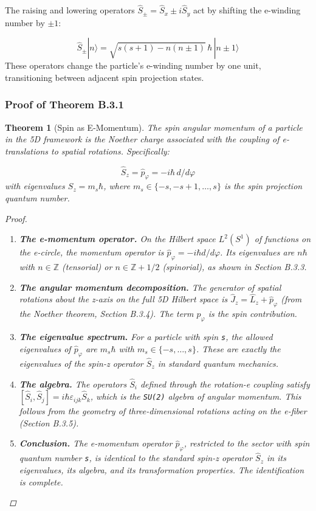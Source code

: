 \documentclass[aps,prd,preprint,superscriptaddress,longbibliography,floatfix]{revtex4-2}
\newtheorem{theorem}{Theorem}[section]
\theoremstyle{remark}
\begin{document}
The raising and lowering operators $\hat{S}_\pm = \hat{S}_x \pm i\hat{S}_y$ act by shifting the e-winding number by $\pm1$:


\begin{equation}
    \hat{S}_\pm |n\rangle = \sqrt{s(s+1) - n(n \pm 1)} \, \hbar \, |n \pm 1\rangle
\end{equation}
These operators change the particle's e-winding number by one unit, transitioning between adjacent spin projection states.


\subsubsection{Proof of Theorem B.3.1}

\begin{theorem}[Spin as E-Momentum]
\label{thm:B31} \textit{The spin angular momentum of a particle in the 5D framework is the Noether charge associated with the coupling of e-translations to spatial rotations. Specifically:}


\begin{equation}
    \hat{S}_z = \hat{p}_\varphi = -i\hbar \, d/d\varphi
\end{equation}
\textit{with eigenvalues $S_z = m_s \hbar$, where $m_s \in \{-s, -s+1, \ldots, s\}$ is the spin projection quantum number.}

\begin{proof}


\begin{enumerate}
  \item \textbf{The e-momentum operator.} On the Hilbert space $L^{2}(S^{1})$ of functions on the e-circle, the momentum operator is $\hat{p}_\varphi = -i\hbar d/d\varphi$. Its eigenvalues are $n\hbar$ with $n \in \mathbb{Z}$ (tensorial) or $n \in \mathbb{Z} + 1/2$ (spinorial), as shown in Section B.3.3.
  \item \textbf{The angular momentum decomposition.} The generator of spatial rotations about the z-axis on the full 5D Hilbert space is $\hat{J}_z = \hat{L}_z + \hat{p}_\varphi$ (from the Noether theorem, Section B.3.4). The term $\hat{p}_\varphi$ is the spin contribution.
  \item \textbf{The eigenvalue spectrum.} For a particle with spin \texttt{s}, the allowed eigenvalues of $\hat{p}_\varphi$ are $m_s \hbar$ with $m_s \in \{-s, \ldots, s\}$. These are exactly the eigenvalues of the spin-z operator $\hat{S}_z$ in standard quantum mechanics.
  \item \textbf{The algebra.} The operators $\hat{S}_i$ defined through the rotation-e coupling satisfy $[\hat{S}_i, \hat{S}_j] = i\hbar \varepsilon_{ijk} \hat{S}_k$, which is the \texttt{SU(2)} algebra of angular momentum. This follows from the geometry of three-dimensional rotations acting on the e-fiber (Section B.3.5).
  \item \textbf{Conclusion.} The e-momentum operator $\hat{p}_\varphi$, restricted to the sector with spin quantum number \texttt{s}, is identical to the standard spin-z operator $\hat{S}_z$ in its eigenvalues, its algebra, and its transformation properties. The identification is complete.
\end{enumerate}


\end{proof}
\end{theorem}
\end{document}
